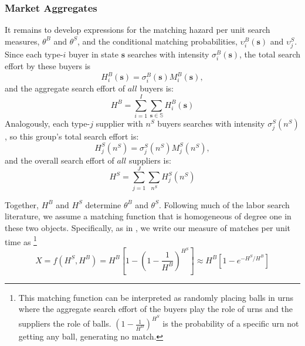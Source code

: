 \documentclass[12pt]{article} \usepackage{amsmath,amssymb,amsthm,geometry,graphicx,setspace,algorithm,algpseudocode,float}
\begin{document}
\subsubsection{Market Aggregates}
\label{sec:aggregates}
It remains to develop expressions for the matching hazard per unit search measures, $\theta^B$ and $\theta^S$, and the conditional matching probabilities, $\upsilon _{i}^{B}(\mathbf{s})$ and $\upsilon_{j}^{S}$.  Since each type-${i}$ buyer in state $\mathbf{s}$ searches with intensity $\sigma _{i}^{B}(\mathbf{s})$, the total search effort by these buyers is%
\begin{equation*}
H_{i}^{B}(\mathbf{s})=\sigma _{i}^{B}(\mathbf{s})M_{i}^{B}(\mathbf{s}),
\end{equation*}%
and the aggregate search effort of $all$  buyers is:%
\begin{equation*}
H^{B}=\sum_{i=1}^{I}\sum_{\mathbf{s}\in \mathbb{S}}H_{i}^{B}(\mathbf{s})
\end{equation*}%
Analogously, each  type-$j$ supplier with $n^S$ buyers 
searches with intensity $\sigma_{j}^{S}(n^S)$, so this group's total
search effort is:%
\begin{equation*}
H_{j}^{S}(n^S)=\sigma_{j}^{S}(n^S)M_{j}^{S}(n^S),
\end{equation*}%
and the overall search effort of $all$ suppliers is:%
\begin{equation*}
H^{S}=\sum_{j=1}^{J}\sum_{n^S}H_{j}^{S}(n^S)
\end{equation*}%
\par
Together, $H^B$ and $H^S$ determine $\theta^B$ and $\theta^S$.
Following much of the labor search literature, we assume a matching function
that is homogeneous of degree one in these two objects. Specifically, as in \citet{petrongolo2001}, we write our measure of matches per unit time as \footnote{\label{footnote:matching_function}This matching function can be interpreted as randomly placing balls in urns where the aggregate search effort of the buyers play the role of urns and the suppliers the role of balls. $(1-\frac{1}{H^B})^{H^S}$ is the probability of a specific urn not getting any ball, generating no match. 
}%
\begin{equation}
X=f(H^{S},H^{B})=H^{B}\left[ 1-(1-\frac{1}{H^{B}})^{H^{S}}\right] \approx
H^{B}\left[ 1-e^{-H^{S}/H^{B}}\right]  \label{match_meas}
\end{equation}%
\end{document}
